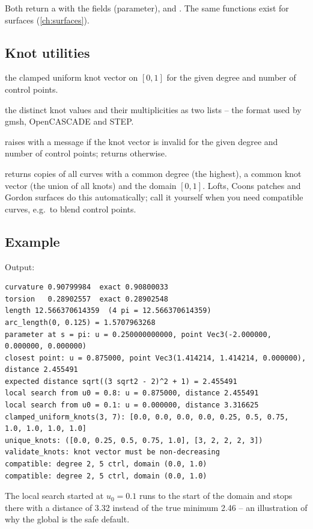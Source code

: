 Both return a  with the fields  (parameter),  and
. The same functions exist for surfaces (\cref{ch:surfaces}).

\subsection{Knot utilities}

\begin{description}[style=nextline]
\item[\apiref{clamped_uniform_knots}\code{(degree, n_ctrl)}] the clamped uniform knot vector on
  $[0,1]$ for the given degree and number of control points.
\item[\apiref{unique_knots}\code{(knots)}] the distinct knot values and their multiplicities as
  two lists -- the format used by gmsh, OpenCASCADE and STEP.
\item[\apiref{validate_knots}\code{(knots, degree, n_ctrl)}] raises  with a
  message if the knot vector is invalid for the given degree and number of control points;
  returns  otherwise.
\item[\apiref{make_compatible}\code{(curves)}] returns copies of all curves with a common degree
  (the highest), a common knot vector (the union of all knots) and the domain $[0,1]$. Lofts,
  Coons patches and Gordon surfaces do this automatically; call it yourself when you need
  compatible curves, e.g.\ to blend control points.
\end{description}

\subsection{Example}


Output:

\begin{lstlisting}[style=text]
curvature 0.90799984  exact 0.90800033
torsion   0.28902557  exact 0.28902548
length 12.566370614359  (4 pi = 12.566370614359)
arc_length(0, 0.125) = 1.5707963268
parameter at s = pi: u = 0.250000000000, point Vec3(-2.000000, 0.000000, 0.000000)
closest point: u = 0.875000, point Vec3(1.414214, 1.414214, 0.000000), distance 2.455491
expected distance sqrt((3 sqrt2 - 2)^2 + 1) = 2.455491
local search from u0 = 0.8: u = 0.875000, distance 2.455491
local search from u0 = 0.1: u = 0.000000, distance 3.316625
clamped_uniform_knots(3, 7): [0.0, 0.0, 0.0, 0.0, 0.25, 0.5, 0.75, 1.0, 1.0, 1.0, 1.0]
unique_knots: ([0.0, 0.25, 0.5, 0.75, 1.0], [3, 2, 2, 2, 3])
validate_knots: knot vector must be non-decreasing
compatible: degree 2, 5 ctrl, domain (0.0, 1.0)
compatible: degree 2, 5 ctrl, domain (0.0, 1.0)
\end{lstlisting}

The local search started at $u_0 = 0.1$ runs to the start of the domain and stops there with a
distance of 3.32 instead of the true minimum 2.46 -- an illustration of why the global
 is the safe default.
